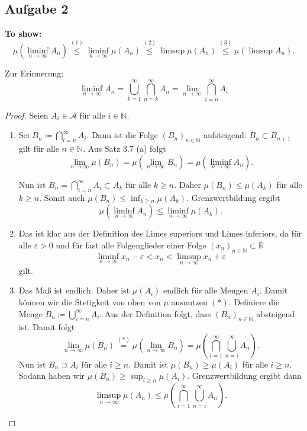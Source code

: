 \documentclass{article}
\newcommand{\R}{\mathbb{R}} %
\newcommand{\N}{\mathbb{N}} %
\begin{document}
\subsection*{Aufgabe 2}
\textbf{To show:
    $$
    \mu (\liminf_{n \to \infty} A_n) \overset{(1)}{\leq} \liminf_{n \to \infty} \mu(A_n) \overset{(2)}{\leq} \limsup \mu(A_n) \overset{(3)}{\leq} \mu(\limsup A_n).
$$ 
}


Zur Erinnerung: 
$$\liminf_{n \to \infty} A_n = \bigcup_{k=1}^\infty \bigcap_{n = k}^\infty A_n = \lim_{n \to \infty} \bigcap_{i=n}^\infty A_i$$

\begin{proof}

Seien $A_i \in \mathcal A$ für alle $i \in \mathbb N$.

\begin{enumerate}[label=(\arabic*)]
    \item
    Sei $B_n \coloneqq \bigcap_{i = n}^\infty A_i$. Dann ist die Folge $(B_n)_{n \in \N}$ aufsteigend: $B_n \subset B_{n+1}$ gilt für alle $n \in \mathbb N$.
    Aus Satz 3.7 (a) folgt
    $$
        \lim_{n \to \infty} \mu(B_n) = \mu(\lim_{n \to \infty} B_n) = \mu(\liminf_{n \to \infty} A_n).
    $$
    
    Nun ist $B_n = \bigcap_{i = n}^\infty A_i \subset A_k$ für alle $k \geq n$. Daher $\mu(B_n) \leq \mu(A_k)$ für alle $k \geq n$. Somit auch $\mu(B_n) \leq \inf_{k \geq n}{\mu(A_k)}$. Grenzwertbildung ergibt
    $$
       \mu(\liminf_{n \to \infty} A_n) \le  \liminf_{n \to \infty} \mu(A_k).
    $$

    \item
    Das ist klar aus der Definition des Limes superiors und Limes inferiors, da für alle $\varepsilon > 0$ und für fast alle Folgenglieder einer Folge $(x_n)_{n \in \N} \subset \R$ 
    \begin{equation*}
        \liminf_{n \to \infty} x_n - \varepsilon
        < x_n
        < \limsup_{n \to \infty} x_n + \varepsilon
    \end{equation*}
    gilt.
    
    \item
    Das Maß ist endlich. Daher ist $\mu(A_i)$ endlich für alle Mengen $A_i$.
    Damit können wir die Stetigkeit von oben von $\mu$ ausnutzen $(*)$.
    Definiere die Menge $B_n \coloneqq \bigcup_{i=n}^\infty A_i$. Aus der Definition folgt, dass $(B_n)_{n \in \mathbb N}$ absteigend ist. Damit folgt
    $$
        \lim_{n \to \infty} \mu(B_n)
        \overset{(*)}{=} \mu (\lim_{n \to \infty} B_n)
        = \mu \left(\bigcap_{i=1}^\infty \bigcup_{n=i}^\infty A_n\right).
    $$
    Nun ist $B_n \supset A_i$ für alle $i \geq n$. Damit ist $\mu(B_n) \geq \mu(A_i)$ für alle $i \geq n$. Sodann haben wir $\mu(B_n) \geq \sup_{i \geq n}\mu(A_i)$. Grenzwertbildung ergibt dann
    $$
        \limsup_{n \to \infty} \mu(A_n)
        \leq \mu \left(\bigcap_{i=1}^\infty \bigcup_{n=i}^\infty A_n\right).
    $$
\end{enumerate}
\end{proof}
\end{document}
